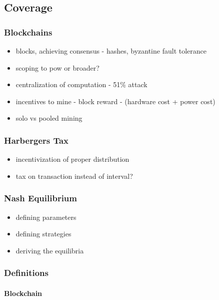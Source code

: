 \subsection{Coverage}

\subsubsection{Blockchains}

\begin{itemize}
  \item blocks, achieving consensus - hashes, byzantine fault tolerance
  \item scoping to pow or broader?
  \item centralization of computation - 51\% attack
  \item incentives to mine - block reward - (hardware cost + power cost)
  \item solo vs pooled mining
\end{itemize}

\subsubsection{Harbergers Tax}

\begin{itemize}
  \item incentivization of proper distribution
  \item tax on transaction instead of interval?
\end{itemize}

\subsubsection{Nash Equilibrium}

\begin{itemize}
  \item defining parameters
  \item defining strategies
  \item deriving the equilibria
\end{itemize}

\subsubsection{Definitions}

\paragraph{Blockchain}

